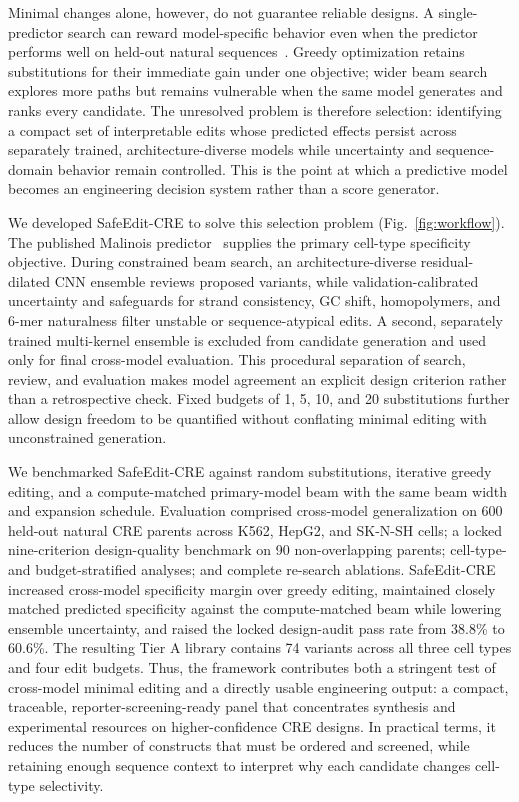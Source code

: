 Minimal changes alone, however, do not guarantee reliable designs. A single-predictor
search can reward model-specific behavior even when the predictor performs well on
held-out natural sequences~\citep{Whalen2022,deBoer2024,Ovadia2019,Rafi2025}. Greedy
optimization retains substitutions for their immediate gain under one objective;
wider beam search explores more paths but remains vulnerable when the same model
generates and ranks every candidate. The unresolved problem is therefore selection:
identifying a compact set of interpretable edits whose predicted effects persist across
separately trained, architecture-diverse models while uncertainty and sequence-domain
behavior remain controlled. This is the point at which a predictive model becomes an
engineering decision system rather than a score generator.

We developed SafeEdit-CRE to solve this selection problem (Fig.~\ref{fig:workflow}).
The published Malinois predictor~\citep{Gosai2024} supplies the primary cell-type
specificity objective. During constrained beam search, an architecture-diverse
residual-dilated CNN ensemble reviews proposed variants, while validation-calibrated
uncertainty and safeguards for strand consistency, GC shift, homopolymers, and 6-mer
naturalness filter unstable or sequence-atypical edits. A second, separately trained
multi-kernel ensemble is excluded from candidate generation and used only for final
cross-model evaluation. This procedural separation of search, review, and evaluation
makes model agreement an explicit design criterion rather than a retrospective check.
Fixed budgets of 1, 5, 10, and 20 substitutions further allow design freedom to be
quantified without conflating minimal editing with unconstrained generation.

We benchmarked SafeEdit-CRE against random substitutions, iterative greedy editing,
and a compute-matched primary-model beam with the same beam width and expansion
schedule. Evaluation comprised cross-model generalization on 600 held-out natural CRE
parents across K562, HepG2, and SK-N-SH cells; a locked nine-criterion design-quality
benchmark on 90 non-overlapping parents; cell-type- and budget-stratified analyses; and
complete re-search ablations. SafeEdit-CRE increased cross-model specificity margin
over greedy editing, maintained closely matched predicted specificity against the
compute-matched beam while lowering ensemble uncertainty, and raised the locked
design-audit pass rate from 38.8\% to 60.6\%. The resulting Tier A library contains 74
variants across all three cell types and four edit budgets. Thus, the framework
contributes both a stringent test of cross-model minimal editing and a directly usable
engineering output: a compact, traceable, reporter-screening-ready panel that
concentrates synthesis and experimental resources on higher-confidence CRE designs.
In practical terms, it reduces the number of constructs that must be ordered and
screened, while retaining enough sequence context to interpret why each candidate
changes cell-type selectivity.

